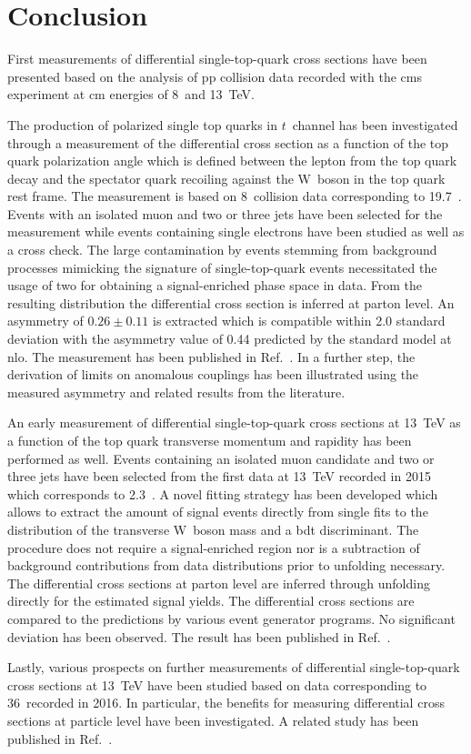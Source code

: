 \chapter{Conclusion}
\label{ch:conclusion}

First measurements of differential single-top-quark cross sections have been presented based on the analysis of \acrlong{pp} collision data recorded with the \gls{cms} experiment at \acrlong{cm} energies of 8~and 13~TeV.

The production of polarized single top quarks in $t$~channel has been investigated through a measurement of the differential cross section as a function of the top quark polarization angle which is defined between the lepton from the top quark decay and the spectator quark recoiling against the W~boson in the top quark rest frame. The measurement is based on 8~\TeV collision data corresponding to 19.7~\invfb. Events with an isolated muon and two or three jets have been selected for the measurement while events containing single electrons have been studied as well as a cross check. The large contamination by events stemming from background processes mimicking the signature of single-top-quark events necessitated the usage of two  for obtaining a signal-enriched phase space in data. From the resulting distribution the differential cross section is inferred at parton level. An asymmetry of $0.26\pm 0.11$ is extracted which is compatible within 2.0 standard deviation with the asymmetry value of 0.44 predicted by the standard model at \gls{nlo}. The measurement has been published in Ref.~\cite{Khachatryan:2015dzz}. In a further step, the derivation of limits on anomalous couplings has been illustrated using the measured asymmetry and related results from the literature.

An early measurement of differential single-top-quark cross sections at 13~TeV as a function of the top quark transverse momentum and rapidity has been performed as well. Events containing an isolated muon candidate and two or three jets have been selected from the first data at 13~TeV recorded in 2015 which corresponds to 2.3~\invfb. A novel fitting strategy has been developed which allows to extract the amount of signal events directly from single fits to the distribution of the transverse W~boson mass and a \gls{bdt} discriminant. The procedure does not require a signal-enriched region nor is a subtraction of background contributions from data distributions prior to unfolding necessary. The differential cross sections at parton level are inferred through unfolding directly for the estimated signal yields. The differential cross sections are compared to the predictions by various event generator programs. No significant deviation has been observed. The result has been published in Ref.~\cite{CMS-PAS-TOP-16-004}.

Lastly, various prospects on further measurements of differential single-top-quark cross sections at 13~TeV have been studied based on data corresponding to 36~\invfb recorded in 2016. In particular, the benefits for measuring differential cross sections at particle level have been investigated. A related study has been published in Ref.~\cite{particleStudies}.

